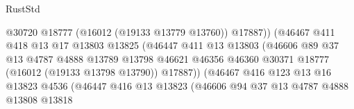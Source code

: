 \begin{lexlean}{RustStd}
\begin{coremodule}
                                              @30720
                                              @18777
                                              (@16012 (@19133 @13779 @13760))
                                              @17887))
                                          (@46467
                                            @411
                                            @418
                                            @13
                                            @17
                                            @13803
                                            @13825
                                            (@46447
                                              @411
                                              @13
                                              @13803
                                              (@46606
                                                @89
                                                @37
                                                @13
                                                @4787
                                                @4888
                                                @13789
                                                @13798
                                                @46621
                                                @46356
                                                @46360
                                                @30371
                                                @18777
                                                (@16012 (@19133 @13798 @13790))
                                                @17887))
                                            (@46467
                                              @416
                                              @123
                                              @13
                                              @16
                                              @13823
                                              @4536
                                              (@46447
                                                @416
                                                @13
                                                @13823
                                                (@46606
                                                  @94
                                                  @37
                                                  @13
                                                  @4787
                                                  @4888
                                                  @13808
                                                  @13818

\end{coremodule}
\end{lexlean}
